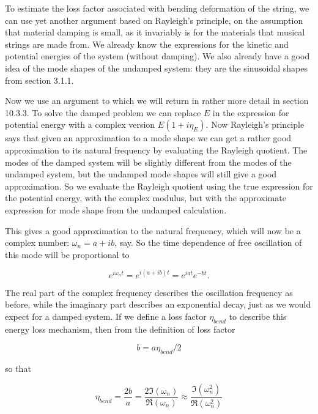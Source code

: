   To estimate the loss factor associated with bending deformation of the 
  string, we can use yet another argument based on Rayleigh's principle, on the 
  assumption that material damping is small, as it invariably is for the 
  materials that musical strings are made from. We already know the expressions 
  for the kinetic and potential energies of the system (without damping). We 
  also already have a good idea of the mode shapes of the undamped system: they 
  are the sinusoidal shapes from section 3.1.1. 

  Now we use an argument to which we will return in rather more detail in 
  section 10.3.3. To solve the damped problem we can replace $E$ in the 
  expression for potential energy with a complex version $E(1+i \eta_E)$. Now 
  Rayleigh’s principle says that given an approximation to a mode shape we can 
  get a rather good approximation to its natural frequency by evaluating the 
  Rayleigh quotient. The modes of the damped system will be slightly different 
  from the modes of the undamped system, but the undamped mode shapes will 
  still give a good approximation. So we evaluate the Rayleigh quotient using 
  the true expression for the potential energy, with the complex modulus, but 
  with the approximate expression for mode shape from the undamped calculation. 

  This gives a good approximation to the natural frequency, which will now be a 
  complex number: $\omega_n=a+ib$, say. So the time dependence of free 
  oscillation of this mode will be proportional to 

  \begin{equation*}e^{i \omega_n t}=e^{i(a+ib)t}=e^{iat} e^{-bt} 
  .\tag{1}\end{equation*} 

  The real part of the complex frequency describes the oscillation frequency as 
  before, while the imaginary part describes an exponential decay, just as we 
  would expect for a damped system. If we define a loss factor $\eta_{bend}$ to 
  describe this energy loss mechanism, then from the definition of loss factor 

  \begin{equation*}b=a \eta_{bend}/2\end{equation*} 

  \noindent{}so that 

  \begin{equation*}\eta_{bend} = \frac{2b}{a} =\frac{2\Im (\omega_n)}{\Re 
  (\omega_n)} \approx \frac{\Im (\omega_n^2)}{\Re (\omega_n^2)} 
  \tag{2}\end{equation*} 


